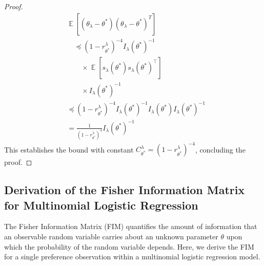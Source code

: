\documentclass{article}
\DeclareMathOperator*{\E}{\mathbb{E}} %
\begin{document}
\begin{proof}
\begin{align*}
&\E[(\theta_\lambda - \theta^*)(\theta_\lambda - \theta^*)^T] \\
&\quad \preceq (1-r^{\lambda}_{\theta^*})^{-4} I_\lambda(\theta^*)^{-1} \\
&\qquad \times \E[s_\lambda(\theta^*) s_\lambda(\theta^*)^\top] \\
&\qquad \times I_\lambda(\theta^*)^{-1} \\
&\preceq (1-r^{\lambda}_{\theta^*})^{-4} I_\lambda(\theta^*)^{-1} I_\lambda(\theta^*) I_\lambda(\theta^*)^{-1} \\
&= \frac{1}{(1-r^{\lambda}_{\theta^*})^4} I_\lambda(\theta^*)^{-1}
\end{align*}
This establishes the bound with constant $C^{\lambda}_{\theta^*} = (1-r^{\lambda}_{\theta^*})^{-4}$, concluding the proof.
\end{proof} 
 
\subsection{Derivation of the Fisher Information Matrix for Multinomial Logistic Regression}
\label{sec:appendix_fim_derivation_multinomial}

The Fisher Information Matrix (FIM) quantifies the amount of information that an observable random variable carries about an unknown parameter $\theta$ upon which the probability of the random variable depends. Here, we derive the FIM for a single preference observation within a multinomial logistic regression model.
\end{document}
